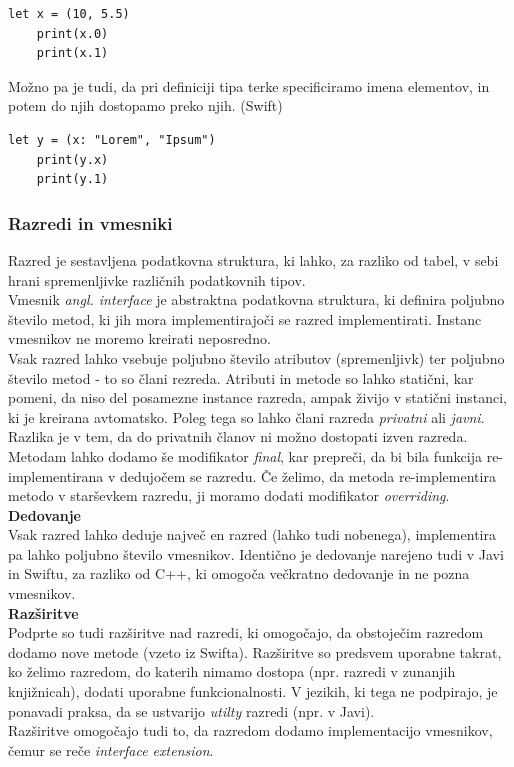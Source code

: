 \documentclass[a4paper, 12pt]{book}
\begin{document}
\begin{lstlisting}[caption={Terka, sestavljena in dveh vrednosti (Int in Double)}, captionpos=b]
	let x = (10, 5.5) 
	print(x.0)
	print(x.1)
\end{lstlisting} 

Možno pa je tudi, da pri definiciji tipa terke specificiramo imena elementov, in potem do njih dostopamo preko njih. (Swift)

\begin{lstlisting}[caption={Terka, v kateri je en element poimenovan, drugi pa ne}, captionpos=b]
	let y = (x: "Lorem", "Ipsum")
	print(y.x)
	print(y.1)
\end{lstlisting}


\subsubsection{Razredi in vmesniki}

Razred je sestavljena podatkovna struktura, ki lahko, za razliko od tabel, v sebi hrani spremenljivke različnih podatkovnih tipov. \\
\indent Vmesnik \textit{angl. interface} je abstraktna podatkovna struktura, ki definira poljubno število metod, ki jih mora implementirajoči se razred implementirati. Instanc vmesnikov ne moremo kreirati neposredno.\\
\indent Vsak razred lahko vsebuje poljubno število atributov (spremenljivk) ter poljubno število metod - to so člani rezreda. Atributi in metode so lahko statični, kar pomeni, da niso del posamezne instance razreda, ampak živijo v statični instanci, ki je kreirana avtomatsko. Poleg tega so lahko člani razreda \textit{privatni} ali \textit{javni}. Razlika je v tem, da do privatnih članov ni možno dostopati izven razreda. Metodam lahko dodamo še modifikator \textit{final}, kar prepreči, da bi bila funkcija re-implementirana v dedujočem se razredu. Če želimo, da metoda re-implementira metodo v starševkem razredu, ji moramo dodati modifikator \textit{overriding}. \\

\indent  \textbf{Dedovanje} \\
\noindent Vsak razred lahko deduje največ en razred (lahko tudi nobenega), implementira pa lahko poljubno število vmesnikov. Identično je dedovanje narejeno tudi v Javi in Swiftu, za razliko od C++, ki omogoča večkratno dedovanje in ne pozna vmesnikov. \\

\indent  \textbf{Razširitve} \\
\noindent Podprte so tudi razširitve nad razredi, ki omogočajo, da obstoječim razredom dodamo nove metode (vzeto iz Swifta). Razširitve so predsvem uporabne takrat, ko želimo razredom, do katerih nimamo dostopa (npr. razredi v zunanjih knjižnicah), dodati uporabne funkcionalnosti. V jezikih, ki tega ne podpirajo, je ponavadi praksa, da se ustvarijo \textit{utilty} razredi (npr. v Javi). \\
\indent Razširitve omogočajo tudi to, da razredom dodamo implementacijo vmesnikov, čemur se reče \textit{interface extension}. \\
\end{document}
